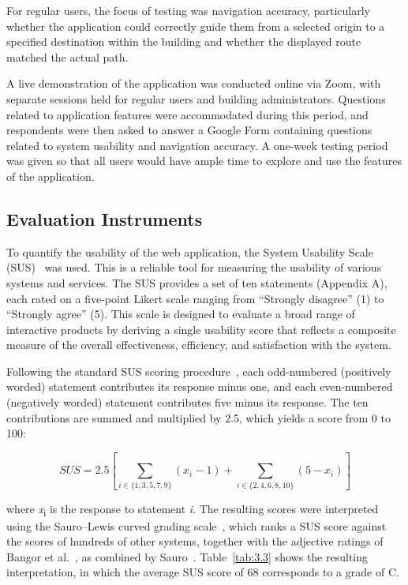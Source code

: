 For regular users, the focus of testing was navigation accuracy, particularly
whether the application could correctly guide them from a selected origin to a
specified destination within the building and whether the displayed route
matched the actual path.

A live demonstration of the application was conducted online via Zoom, with
separate sessions held for regular users and building administrators. Questions
related to application features were accommodated during this period, and
respondents were then asked to answer a Google Form containing questions related
to system usability and navigation accuracy. A one-week testing period was given
so that all users would have ample time to explore and use the features of the
application.

\subsection{Evaluation Instruments}\label{sec:3.6.3}

To quantify the usability of the web application, the System Usability Scale
(SUS)~\cite{ref20} was used. This is a reliable tool for measuring the usability
of various systems and services. The SUS provides a set of ten statements
(Appendix A), each rated on a five-point Likert scale ranging from ``Strongly
disagree'' (1) to ``Strongly agree'' (5). This scale is designed to evaluate a
broad range of interactive products by deriving a single usability score that
reflects a composite measure of the overall effectiveness, efficiency, and
satisfaction with the system.

Following the standard SUS scoring procedure~\cite{ref20}, each odd-numbered
(positively worded) statement contributes its response minus one, and each
even-numbered (negatively worded) statement contributes five minus its response.
The ten contributions are summed and multiplied by 2.5, which yields a score
from 0 to 100:

\begin{equation}
\label{eq:3.1}
SUS = 2.5\left\lbrack \sum_{i \in \{ 1,3,5,7,9\}}^{}\left( x_{i} - 1 \right) + \sum_{i \in \{ 2,4,6,8,10\}}^{}\left( 5 - x_{i} \right) \right\rbrack
\end{equation}

\noindent where \emph{x}\textsubscript{i} is the response to statement \emph{i}.
The resulting scores were interpreted using the Sauro--Lewis curved grading
scale~\cite{ref21}, which ranks a SUS score against the scores of hundreds of
other systems, together with the adjective ratings of Bangor et
al.~\cite{ref22}, as combined by Sauro~\cite{ref23}. Table~\ref{tab:3.3} shows
the resulting interpretation, in which the average SUS score of 68 corresponds
to a grade of C.

